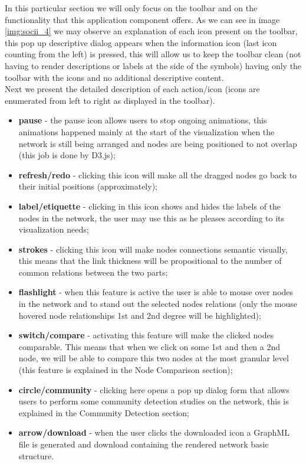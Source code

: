 In this particular section we will only focus on the toolbar and on the functionality that this application component offers. As we can see in image \ref{img:socii_4} we may observe an explanation of each icon present on the toolbar, this pop up descriptive dialog appears when the information icon (last icon counting from the left) is pressed, this will allow us to keep the toolbar clean (not having to render descriptions or labels at the side of the symbols) having only the toolbar with the icons and no additional descriptive content.\\
\indent Next we present the detailed description of each action/icon (icons are enumerated from left to right as displayed in the toolbar).
\begin{itemize}
    \item \textbf{pause} - the pause icon allows users to stop ongoing animations, this animations happened mainly at the start of the visualization when the network is still being arranged and nodes are being positioned to not overlap (this job is done by D3.js);
    \item \textbf{refresh/redo} - clicking this icon will make all the dragged nodes go back to their initial positions (approximately);
    \item \textbf{label/etiquette} - clicking in this icon shows and hides the labels of the nodes in the network, the user may use this as he pleases according to its visualization needs;
    \item \textbf{strokes} - clicking this icon will make nodes connections semantic visually, this means that the link thickness will be propositional to the number of common relations between the two parts;
    \item \textbf{flashlight} - when this feature is active the user is able to mouse over nodes in the network and to stand out the selected nodes relations (only the mouse hovered node relationships 1st and 2nd degree will be highlighted);
    \item \textbf{switch/compare} - activating this feature will make the clicked nodes comparable. This means that when we click on some 1st and then a 2nd node, we will be able to compare this two nodes at the most granular level (this feature is explained in the Node Comparison section);
    \item \textbf{circle/community} - clicking here opens a pop up dialog form that allows users to perform some community detection studies on the network, this is explained in the Community Detection section;
    \item \textbf{arrow/download} - when the user clicks the downloaded icon a GraphML file is generated and download containing the rendered network basic structure.
\end{itemize}

